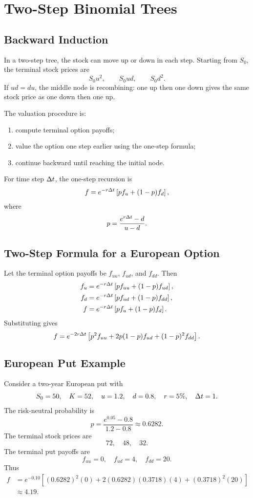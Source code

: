 \section{Two-Step Binomial Trees}

\subsection{Backward Induction}

In a two-step tree, the stock can move up or down in each step. Starting from
$S_0$, the terminal stock prices are
\[
    S_0u^2,
    \qquad
    S_0ud,
    \qquad
    S_0d^2.
\]
If $ud=du$, the middle node is recombining: one up then one down gives the same
stock price as one down then one up.

The valuation procedure is:
\begin{enumerate}
    \item compute terminal option payoffs;
    \item value the option one step earlier using the one-step formula;
    \item continue backward until reaching the initial node.
\end{enumerate}

For time step $\Delta t$, the one-step recursion is
\[
    f=e^{-r\Delta t}\left[p f_u+(1-p)f_d\right],
\]
where
\[
    p=\frac{e^{r\Delta t}-d}{u-d}.
\]

\subsection{Two-Step Formula for a European Option}

Let the terminal option payoffs be $f_{uu}$, $f_{ud}$, and $f_{dd}$. Then
\[
\begin{aligned}
    f_u &= e^{-r\Delta t}\left[p f_{uu}+(1-p)f_{ud}\right],\\
    f_d &= e^{-r\Delta t}\left[p f_{ud}+(1-p)f_{dd}\right],\\
    f   &= e^{-r\Delta t}\left[p f_u+(1-p)f_d\right].
\end{aligned}
\]
Substituting gives
\[
    f=e^{-2r\Delta t}
    \left[
        p^2 f_{uu}
        +2p(1-p)f_{ud}
        +(1-p)^2 f_{dd}
    \right].
\]

\subsection{European Put Example}

Consider a two-year European put with
\[
    S_0=50,\quad K=52,\quad u=1.2,\quad d=0.8,\quad r=5\%,
    \quad \Delta t=1.
\]
The risk-neutral probability is
\[
    p=\frac{e^{0.05}-0.8}{1.2-0.8}
    \approx 0.6282.
\]
The terminal stock prices are
\[
    72,\quad 48,\quad 32.
\]
The terminal put payoffs are
\[
    f_{uu}=0,\quad f_{ud}=4,\quad f_{dd}=20.
\]
Thus
\[
\begin{aligned}
    f
    &=
    e^{-0.10}
    \left[
        (0.6282)^2(0)
        +2(0.6282)(0.3718)(4)
        +(0.3718)^2(20)
    \right] \\
    &\approx
    4.19.
\end{aligned}
\]

